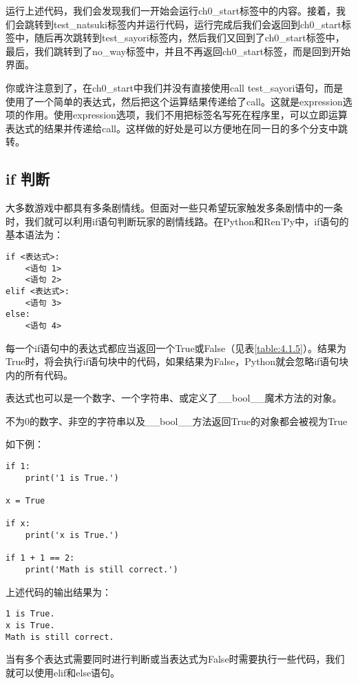 运行上述代码，我们会发现我们一开始会运行ch0\_start标签中的内容。接着，我们会跳转到test\_natsuki标签内并运行代码，运行完成后我们会返回到ch0\_start标签中，随后再次跳转到test\_sayori标签内，然后我们又回到了ch0\_start标签中，最后，我们跳转到了no\_way标签中，并且不再返回ch0\_start标签，而是回到开始界面。

你或许注意到了，在ch0\_start中我们并没有直接使用call test\_sayori语句，而是使用了一个简单的表达式，然后把这个运算结果传递给了call。这就是expression选项的作用。使用expression选项，我们不用把标签名写死在程序里，可以立即运算表达式的结果并传递给call。这样做的好处是可以方便地在同一日的多个分支中跳转。

\subsection{if 判断}
大多数游戏中都具有多条剧情线。但面对一些只希望玩家触发多条剧情中的一条时，我们就可以利用if语句判断玩家的剧情线路。在Python和Ren'Py中，if语句的基本语法为：
\begin{lstlisting}
if <表达式>:
    <语句 1>
    <语句 2>
elif <表达式>:
    <语句 3>
else:
    <语句 4>
\end{lstlisting}

每一个if语句中的表达式都应当返回一个True或False（见表\ref{table:4.1.5}）。结果为True时，将会执行if语句块中的代码，如果结果为False，Python就会忽略if语句块内的所有代码。

\begin{ExtraKnowledge}
    表达式也可以是一个数字、一个字符串、或定义了\_\_bool\_\_魔术方法的对象。

    不为0的数字、非空的字符串以及\_\_bool\_\_方法返回True的对象都会被视为True
\end{ExtraKnowledge}

如下例：

\begin{lstlisting}
if 1:
    print('1 is True.')

x = True

if x:
    print('x is True.')

if 1 + 1 == 2:
    print('Math is still correct.')
\end{lstlisting}

上述代码的输出结果为：
\begin{lstlisting}
1 is True.
x is True.
Math is still correct.
\end{lstlisting}

当有多个表达式需要同时进行判断或当表达式为False时需要执行一些代码，我们就可以使用elif和else语句。

